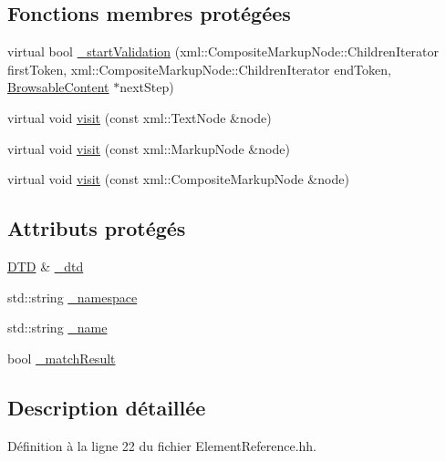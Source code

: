 \subsection*{Fonctions membres protégées}
\begin{DoxyCompactItemize}
\item 
virtual bool \hyperlink{classdtd_1_1_element_reference_a04d0141fbcfd0ff6171cd085c91e5622}{\_\-startValidation} (xml::CompositeMarkupNode::ChildrenIterator firstToken, xml::CompositeMarkupNode::ChildrenIterator endToken, \hyperlink{classdtd_1_1_browsable_content}{BrowsableContent} $\ast$nextStep)
\item 
virtual void \hyperlink{classdtd_1_1_element_reference_a4ffa8db697a0da84571c01623b9ab969}{visit} (const xml::TextNode \&node)
\item 
virtual void \hyperlink{classdtd_1_1_element_reference_aa983fa6f899fdfc9ad7769f5a479dce4}{visit} (const xml::MarkupNode \&node)
\item 
virtual void \hyperlink{classdtd_1_1_element_reference_a623d753307b938b9b29501bb96d9503d}{visit} (const xml::CompositeMarkupNode \&node)
\end{DoxyCompactItemize}
\subsection*{Attributs protégés}
\begin{DoxyCompactItemize}
\item 
\hyperlink{classdtd_1_1_d_t_d}{DTD} \& \hyperlink{classdtd_1_1_element_reference_a1aa135e9320d9117a70401d299ad04cb}{\_\-dtd}
\item 
std::string \hyperlink{classdtd_1_1_element_reference_ae290dc9372690c6ec326ee77594466ec}{\_\-namespace}
\item 
std::string \hyperlink{classdtd_1_1_element_reference_a3644697416e87370eedfa296d1c976ac}{\_\-name}
\item 
bool \hyperlink{classdtd_1_1_element_reference_ac8eea1ec6ad68e911179025d5471929b}{\_\-matchResult}
\end{DoxyCompactItemize}


\subsection{Description détaillée}


Définition à la ligne 22 du fichier ElementReference.hh.



